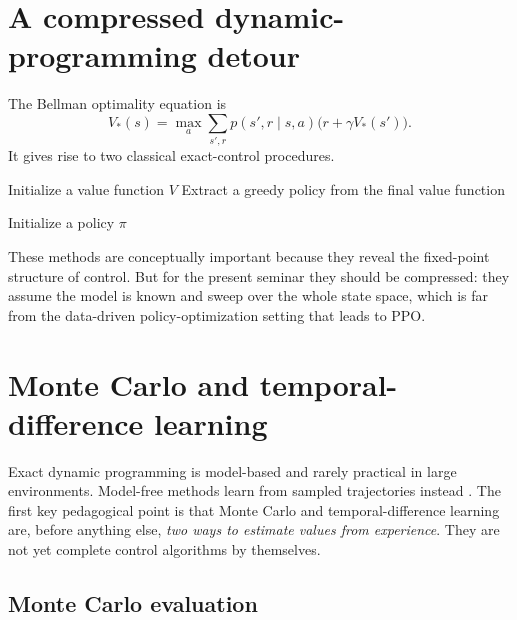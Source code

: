 \documentclass[11pt]{article}
\newcommand{\1}{\mathbf{1}}
\begin{document}
\section{A compressed dynamic-programming detour}

The Bellman optimality equation is
\begin{equation}
V_*(s)=\max_a\sum_{s',r}p(s',r\mid s,a)\bigl(r+\gamma V_*(s')\bigr).
\end{equation}
It gives rise to two classical exact-control procedures.



\begin{algorithm}[htbp]
\caption{Value iteration}
Initialize a value function $V$\;
Extract a greedy policy from the final value function\;
\end{algorithm}

\begin{algorithm}[htbp]
\caption{Policy iteration}
Initialize a policy $\pi$\;
\end{algorithm}


These methods are conceptually important because they reveal the fixed-point structure of control. But for the present seminar they should be compressed: they assume the model is known and sweep over the whole state space, which is far from the data-driven policy-optimization setting that leads to PPO.

\section{Monte Carlo and temporal-difference learning}\label{sec:mc-td}

Exact dynamic programming is model-based and rarely practical in large environments. Model-free methods learn from sampled trajectories instead \cite{SuttonBarto2018}. The first key pedagogical point is that Monte Carlo and temporal-difference learning are, before anything else, \emph{two ways to estimate values from experience}. They are not yet complete control algorithms by themselves.

\subsection{Monte Carlo evaluation}
\end{document}
